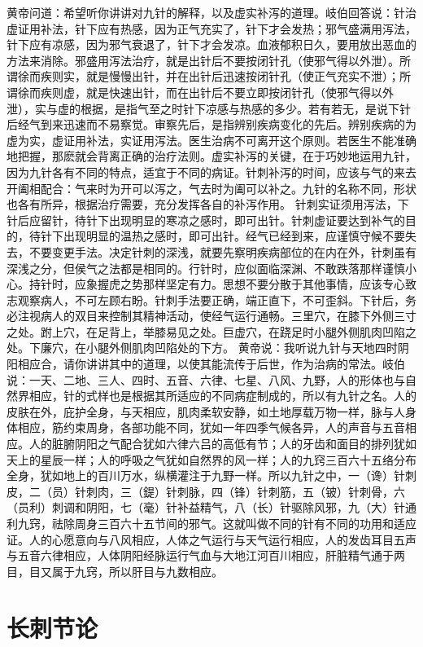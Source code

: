 \documentclass[12pt,UTF8]{ctexbook}
\begin{document}
黄帝问道：希望听你讲讲对九针的解释，以及虚实补泻的道理。岐伯回答说：针治虚证用补法，针下应有热感，因为正气充实了，针下才会发热；邪气盛满用泻法，针下应有凉感，因为邪气衰退了，针下才会发凉。血液郁积日久，要用放出恶血的方法来消除。邪盛用泻法治疗，就是出针后不要按闭针孔（使邪气得以外泄）。所谓徐而疾则实，就是慢慢出针，并在出针后迅速按闭针孔（使正气充实不泄）；所谓徐而疾则虚，就是快速出针，而在出针后不要立即按闭针孔（使邪气得以外泄），实与虚的根据，是指气至之时针下凉感与热感的多少。若有若无，是说下针后经气到来迅速而不易察觉。审察先后，是指辨别疾病变化的先后。辨别疾病的为虚为实，虚证用补法，实证用泻法。医生治病不可离开这个原则。若医生不能准确地把握，那麽就会背离正确的治疗法则。虚实补泻的关键，在于巧妙地运用九针，因为九针各有不同的特点，适宜于不同的病证。针刺补泻的时间，应该与气的来去开阖相配合：气来时为开可以泻之，气去时为阖可以补之。九针的名称不同，形状也各有所异，根据治疗需要，充分发挥各自的补泻作用。
针刺实证须用泻法，下针后应留针，待针下出现明显的寒凉之感时，即可出针。针刺虚证要达到补气的目的，待针下出现明显的温热之感时，即可出针。经气已经到来，应谨慎守候不要失去，不要变更手法。决定针刺的深浅，就要先察明疾病部位的在内在外，针刺虽有深浅之分，但侯气之法都是相同的。行针时，应似面临深渊、不敢跌落那样谨慎小心。持针时，应象握虎之势那样坚定有力。思想不要分散于其他事情，应该专心致志观察病人，不可左顾右盼。针刺手法要正确，端正直下，不可歪斜。下针后，务必注视病人的双目来控制其精神活动，使经气运行通畅。三里穴，在膝下外侧三寸之处。跗上穴，在足背上，举膝易见之处。巨虚穴，在跷足时小腿外侧肌肉凹陷之处。下廉穴，在小腿外侧肌肉凹陷处的下方。
黄帝说：我听说九针与天地四时阴阳相应合，请你讲讲其中的道理，以使其能流传于后世，作为治病的常法。岐伯说：一天、二地、三人、四时、五音、六律、七星、八风、九野，人的形体也与自然界相应，针的式样也是根据其所适应的不同病症制成的，所以有九针之名。人的皮肤在外，庇护全身，与天相应，肌肉柔软安静，如土地厚载万物一样，脉与人身体相应，筋约束周身，各部功能不同，犹如一年四季气候各异，人的声音与五音相应。人的脏腑阴阳之气配合犹如六律六吕的高低有节；人的牙齿和面目的排列犹如天上的星辰一样；人的呼吸之气犹如自然界的风一样；人的九窍三百六十五络分布全身，犹如地上的百川万水，纵横灌注于九野一样。所以九针之中，一（谗）针刺皮，二（员）针刺肉，三（鍉）针刺脉，四（锋）针刺筋，五（铍）针刺骨，六（员利）刺调和阴阳，七（毫）针补益精气，八（长）针驱除风邪，九（大）针通利九窍，祛除周身三百六十五节间的邪气。这就叫做不同的针有不同的功用和适应证。人的心愿意向与八风相应，人体之气运行与天气运行相应，人的发齿耳目五声与五音六律相应，人体阴阳经脉运行气血与大地江河百川相应，肝脏精气通于两目，目又属于九窍，所以肝目与九数相应。

\chapter{长刺节论}
\end{document}
